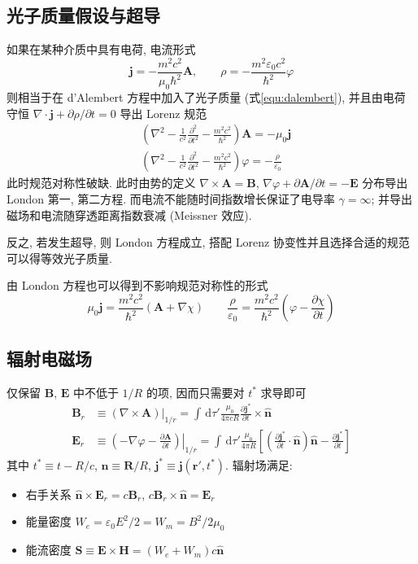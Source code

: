 \documentclass[12pt,a4paper]{article}%
\numberwithin{equation}{section}%
\renewcommand*{\vec}[1]{\bm{#1}}%
\newcommand{\dif}{\,\mathrm d}
\newcommand*{\uvec}[1]{\hat{\vec{#1}}}
\begin{document}
\subsection{光子质量假设与超导} %
\label{sub:mass_of_photon}
如果在某种介质中具有电荷, 电流形式
\begin{equation}
    \vec j = -\frac{m^2c^2}{\mu_0\hbar^2}{\vec A}, \qquad
    \rho = -\frac{m^2\varepsilon_0 c^2}{\hbar^2}\varphi
\end{equation}
则相当于在 d'Alembert 方程中加入了光子质量 (式\ref{equ:dalembert}), 并且由电荷守恒 $\nabla\cdot\vec j + \partial\rho/\partial t = 0$ 导出 Lorenz 规范
\begin{align}
    &\left(\nabla^2- \frac 1{c^2}\frac{\partial^2}{\partial t^2} - \frac{m^2c^2}{\hbar^2}\right)\vec A = -\mu_0\vec j \\
    &\left(\nabla^2- \frac 1{c^2}\frac{\partial^2}{\partial t^2} - \frac{m^2c^2}{\hbar^2}\right)\varphi = -\frac{\rho}{\varepsilon_0}
\end{align}
此时规范对称性破缺. 此时由势的定义 $\nabla\times\vec A = \vec B$, $\nabla\varphi + \partial\vec A/\partial t = -\vec E$ 分布导出 London 第一, 第二方程. 而电流不能随时间指数增长保证了电导率 $\gamma = \infty$; 并导出磁场和电流随穿透距离指数衰减 (Meissner 效应).

反之, 若发生超导, 则 London 方程成立, 搭配 Lorenz 协变性并且选择合适的规范可以得等效光子质量. 

由 London 方程也可以得到不影响规范对称性的形式
\begin{equation}
    \mu_0\vec j = \frac{m^2c^2}{\hbar^2}\left(\vec A + \nabla\chi\right) \qquad
    \frac{\rho}{\varepsilon_0} = \frac{m^2c^2}{\hbar^2}\left(\varphi - \frac{\partial \chi}{\partial t}\right)
\end{equation}
\subsection{辐射电磁场} %
\label{sub:radation_field}
仅保留 $\vec B$, $\vec E$ 中不低于 $1/R$ 的项, 因而只需要对 $t^*$ 求导即可
\begin{align}
    \vec B_r &\equiv \left.\left(\nabla\times\vec A\right)\right|_{1/r} 
    = \int\dif \tau'\frac{\mu_0}{4\pi cR}\frac{\partial\vec j^*}{\partial t}\times\uvec n \\
    \vec E_r &\equiv \left.\left(-\nabla\varphi - \frac{\partial\vec A}{\partial t}\right)\right|_{1/r} 
    = \int\dif \tau'\frac{\mu_0}{4\pi R}\left[\left(\frac{\partial\vec j^*}{\partial t}\cdot\uvec n\right)\uvec n - \frac{\partial\vec j^*}{\partial t}\right]
\end{align}
其中 $t^*\equiv t-R/c$, $\uvec n \equiv \vec R/R$, $\vec j^*\equiv \vec j(\vec r',t^*)$. 辐射场满足:
\begin{itemize}
     \item 右手关系 $\uvec n\times\vec E_r = c\vec B_r$, $c\vec B_r \times\uvec n = \vec E_r$
     \item 能量密度 $W_e = \varepsilon_0 E^2/2 = W_m = B^2/2\mu_0$
     \item 能流密度 $\vec S \equiv \vec E\times\vec H = (W_e + W_m)c\uvec n$
\end{itemize} 
\end{document}
